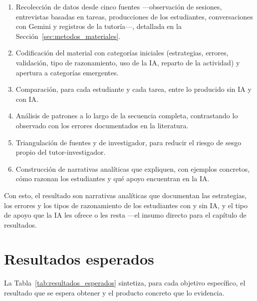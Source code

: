 \begin{enumerate}
  \item Recolección de datos desde cinco fuentes ---observación de sesiones, entrevistas basadas en tareas, producciones de los estudiantes, conversaciones con Gemini y registros de la tutoría---, detallada en la Sección~\ref{sec:metodos_materiales}.
  \item Codificación del material con categorías iniciales (estrategias, errores, validación, tipo de razonamiento, uso de la IA, reparto de la actividad) y apertura a categorías emergentes.
  \item Comparación, para cada estudiante y cada tarea, entre lo producido sin IA y con IA.
  \item Análisis de patrones a lo largo de la secuencia completa, contrastando lo observado con los errores documentados en la literatura.
  \item Triangulación de fuentes y de investigador, para reducir el riesgo de sesgo propio del tutor-investigador.
  \item Construcción de narrativas analíticas que expliquen, con ejemplos concretos, cómo razonan los estudiantes y qué apoyo encuentran en la IA.
\end{enumerate}

Con esto, el resultado son narrativas analíticas que documentan las estrategias, los errores y los tipos de razonamiento de los estudiantes con y sin IA, y el tipo de apoyo que la IA les ofrece o les resta ---el insumo directo para el capítulo de resultados.

\section{Resultados esperados}
\label{sec:resultados_esperados}

La Tabla~\ref{tab:resultados_esperados} sintetiza, para cada objetivo específico, el resultado que se espera obtener y el producto concreto que lo evidencia.

